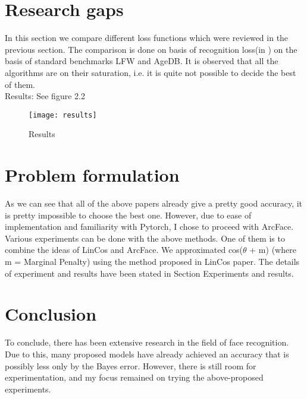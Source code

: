 \section{Research gaps}
In this section we compare different loss functions which were reviewed in the previous section. The comparison is done on basis of recognition loss(in ) on the basis of standard benchmarks LFW and AgeDB. It is observed that all the algorithms are on their saturation, i.e. it is quite not possible to decide the best of them.\\
Results: See figure 2.2
	\begin{figure}[!h]
    		\centering
    		\texttt{[image: results]}
    		\caption{Results}
	\end{figure}
\section{Problem formulation}
As we can see that all of the above papers already give a pretty good accuracy, it is pretty impossible to choose the best one. However, due to ease of implementation and familiarity with Pytorch, I chose to proceed with ArcFace. Various experiments can be done with the above methods. One of them is to combine the ideas of LinCos and ArcFace. We approximated cos($\theta$ + m) (where m = Marginal Penalty) using the method proposed in LinCos paper. The details of experiment and results have been stated in Section Experiments and results.
\section{Conclusion}
To conclude, there has been extensive research in the field of face recognition. Due to this, many proposed models have already achieved an accuracy that is possibly less only by the Bayes error. However, there is still room for experimentation, and my focus remained on trying the above-proposed experiments.